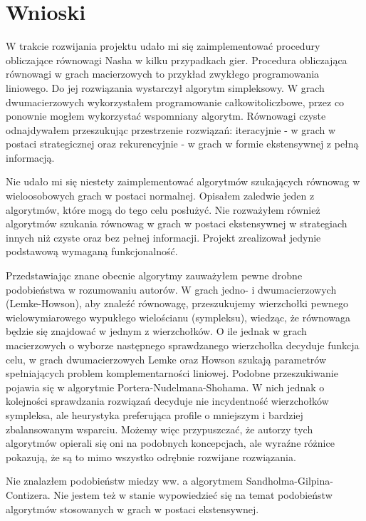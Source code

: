 \documentclass[polish]{standalone}
\begin{document}
\pagestyle{headings}

\chapter{Wnioski}

W trakcie rozwijania projektu udało mi się zaimplementować procedury obliczające równowagi Nasha w kilku przypadkach
gier. Procedura obliczająca równowagi w grach macierzowych to przykład zwykłego programowania liniowego. Do jej
rozwiązania wystarczył algorytm simpleksowy. W grach dwumacierzowych wykorzystałem programowanie całkowitoliczbowe,
przez co ponownie mogłem wykorzystać wspomniany algorytm. Równowagi czyste odnajdywałem przeszukując przestrzenie
rozwiązań: iteracyjnie - w grach w postaci strategicznej oraz rekurencyjnie - w grach w formie ekstensywnej z pełną
informacją.

Nie udało mi się niestety zaimplementować algorytmów szukających równowag w wieloosobowych grach w postaci normalnej.
Opisałem zaledwie jeden z algorytmów, które mogą do tego celu posłużyć. Nie rozważyłem również algorytmów szukania
równowag w grach w postaci ekstensywnej w strategiach innych niż czyste oraz bez pełnej informacji. Projekt zrealizował
jedynie podstawową wymaganą funkcjonalność.

Przedstawiając znane obecnie algorytmy zauważyłem pewne drobne podobieństwa w rozumowaniu autorów. W grach jedno- i
dwumacierzowych (Lemke-Howson), aby znaleźć równowagę, przeszukujemy wierzchołki pewnego wielowymiarowego wypukłego
wielościanu (sympleksu), wiedząc, że równowaga będzie się znajdować w jednym z wierzchołków. O ile jednak w grach
macierzowych o wyborze następnego sprawdzanego wierzchołka decyduje funkcja celu, w grach dwumacierzowych Lemke oraz
Howson szukają parametrów spełniających problem komplementarności liniowej. Podobne przeszukiwanie pojawia się w
algorytmie Portera-Nudelmana-Shohama. W nich jednak o kolejności sprawdzania rozwiązań decyduje nie incydentność
wierzchołków sympleksa, ale heurystyka preferująca profile o mniejszym i bardziej zbalansowanym wsparciu. Możemy więc
przypuszczać, że autorzy tych algorytmów opierali się oni na podobnych koncepcjach, ale wyraźne różnice pokazują, że są
to mimo wszystko odrębnie rozwijane rozwiązania.

Nie znalazłem podobieństw miedzy ww. a algorytmem Sandholma-Gilpina-Contizera. Nie jestem też w stanie wypowiedzieć się
na temat podobieństw algorytmów stosowanych w grach w postaci ekstensywnej.
\end{document}
